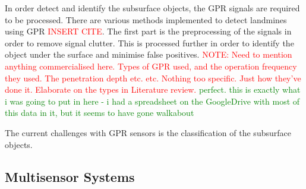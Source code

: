 \documentclass[main.tex]{subfiles}
\begin{document}
In order detect and identify the subsurface objects, the GPR signals are required to be processed. There are various methods implemented to detect landmines using GPR \textcolor{red}{INSERT CITE}. The first part is the preprocessing of the signals in order to remove signal clutter. This is processed further in order to identify the object under the surface and minimise false positives.    
\textcolor{red}{NOTE: Need to mention anything commercialised here. Types of GPR used, and the operation frequency they used. The penetration depth etc. etc. Nothing too specific. Just how they've done it. Elaborate on the types in Literature review.} \textcolor{green}{perfect. this is exactly what i was going to put in here - i had a spreadsheet on the GoogleDrive with most of this data in it, but it seems to have gone walkabout}




The current challenges with GPR sensors is the classification of the subsurface objects. %



\subsection{Multisensor Systems}
\end{document}

